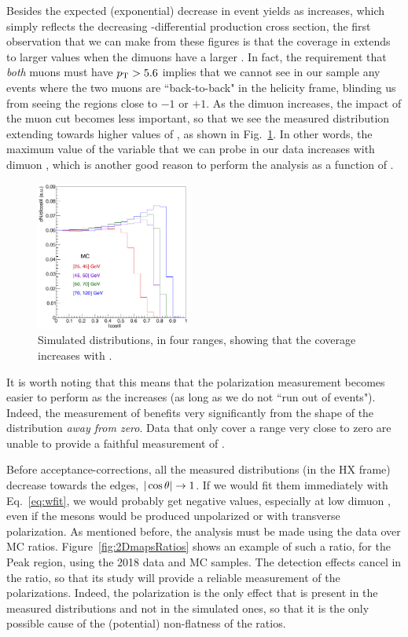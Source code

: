 Besides the expected (exponential) decrease in event yields as \pt increases,
which simply reflects the decreasing \pt-differential production cross section, 
the first observation that we can make from these figures is that the coverage in 
\abscosth extends to larger values when the dimuons have a larger \pt.
In fact, the requirement that \emph{both} muons must have $p_\text{T} > 5.6$\GeV 
implies that we cannot see in our sample any events where the two muons are
``back-to-back" in the helicity frame, 
blinding us from seeing the \costh regions close to $-1$ or $+1$.
As the dimuon \pt increases, the impact of the muon \pt cut becomes less important,
so that we see the measured \abscosth distribution extending towards higher
values of \abscosth, as shown in Fig.~\ref{fig:costCov}.
In other words, the maximum value of the \abscosth variable that we can probe
in our data increases with dimuon \pt, 
which is another good reason to perform the analysis as a function of \pt.

\begin{figure}[t]
\centering
\includegraphics[width=0.45\textwidth]{Figures/chapter3/cos_MC2.pdf}
\caption{Simulated \abscosth distributions, in four \jpsi \pt ranges, 
showing that the \abscosth coverage increases with \pt.}
\label{fig:costCov}
\end{figure}

It is worth noting that this means that the polarization measurement becomes 
easier to perform as the \jpsi \pt increases (as long as we do not ``run out of events").
Indeed, the measurement of \lth benefits very significantly from the shape 
of the \costh distribution \emph{away from zero}.
Data that only cover a \costh range very close to zero are unable to
provide a faithful measurement of \lth.

Before acceptance-corrections, all the measured \costh distributions 
(in the HX frame) decrease towards the edges, $|\cos\theta| \to 1$.
If we would fit them immediately with Eq.~\ref{eq:wfit}, we would probably get
negative \lth values, especially at low dimuon \pt, even if the \jpsi mesons
would be produced unpolarized or with transverse polarization.
As mentioned before, the analysis must be made using the data over MC ratios.
Figure~\ref{fig:2DmapsRatios} shows an example of such a ratio, 
for the Peak region, using the 2018 data and MC \jpsi samples.
The detection effects cancel in the ratio, so that 
its study will provide a reliable measurement of the polarizations.
Indeed, the polarization is the only effect that is present in the
measured distributions and not in the simulated ones, so that it
is the only possible cause of the (potential) non-flatness of the ratios.

